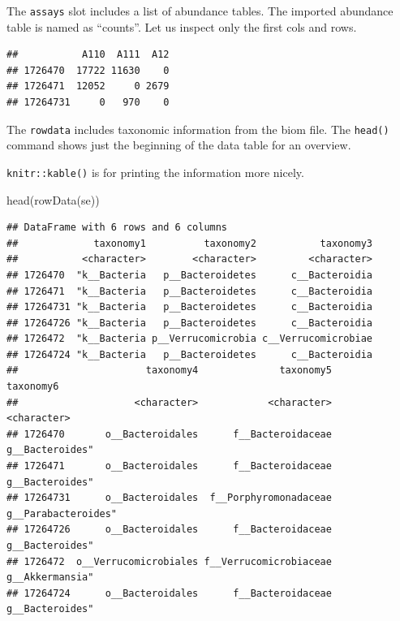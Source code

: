 \documentclass[
]{book}
\newenvironment{Shaded}{\begin{snugshade}}{\end{snugshade}}
\newcommand{\DecValTok}[1]{\textcolor[rgb]{0.00,0.00,0.81}{#1}}
\newcommand{\FunctionTok}[1]{\textcolor[rgb]{0.00,0.00,0.00}{#1}}
\newcommand{\NormalTok}[1]{#1}
\newcommand{\SpecialCharTok}[1]{\textcolor[rgb]{0.00,0.00,0.00}{#1}}
\begin{document}
The \texttt{assays} slot includes a list of abundance tables. The imported
abundance table is named as ``counts''. Let us inspect only the first
cols and rows.

\begin{Shaded}
\end{Shaded}

\begin{verbatim}
##           A110  A111  A12
## 1726470  17722 11630    0
## 1726471  12052     0 2679
## 17264731     0   970    0
\end{verbatim}

The \texttt{rowdata} includes taxonomic information from the biom file. The \texttt{head()} command
shows just the beginning of the data table for an overview.

\texttt{knitr::kable()} is for printing the information more nicely.

\begin{Shaded}
\begin{Highlighting}[]
\FunctionTok{head}\NormalTok{(}\FunctionTok{rowData}\NormalTok{(se))}
\end{Highlighting}
\end{Shaded}

\begin{verbatim}
## DataFrame with 6 rows and 6 columns
##             taxonomy1          taxonomy2           taxonomy3
##           <character>        <character>         <character>
## 1726470  "k__Bacteria   p__Bacteroidetes      c__Bacteroidia
## 1726471  "k__Bacteria   p__Bacteroidetes      c__Bacteroidia
## 17264731 "k__Bacteria   p__Bacteroidetes      c__Bacteroidia
## 17264726 "k__Bacteria   p__Bacteroidetes      c__Bacteroidia
## 1726472  "k__Bacteria p__Verrucomicrobia c__Verrucomicrobiae
## 17264724 "k__Bacteria   p__Bacteroidetes      c__Bacteroidia
##                      taxonomy4              taxonomy5           taxonomy6
##                    <character>            <character>         <character>
## 1726470       o__Bacteroidales      f__Bacteroidaceae     g__Bacteroides"
## 1726471       o__Bacteroidales      f__Bacteroidaceae     g__Bacteroides"
## 17264731      o__Bacteroidales  f__Porphyromonadaceae g__Parabacteroides"
## 17264726      o__Bacteroidales      f__Bacteroidaceae     g__Bacteroides"
## 1726472  o__Verrucomicrobiales f__Verrucomicrobiaceae     g__Akkermansia"
## 17264724      o__Bacteroidales      f__Bacteroidaceae     g__Bacteroides"
\end{verbatim}
\end{document}
